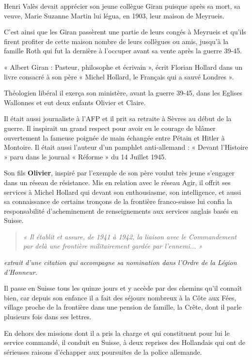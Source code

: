 Henri Valès devait apprécier son jeune collègue Giran puisque après sa mort, sa veuve, Marie
Suzanne Martin lui légua, en 1903, leur maison de Meyrueis.

C’est ainsi que les Giran passèrent une partie de leurs congés à Meyrueis et qu’ils firent
profiter de cette maison nombre de leurs collègues ou amis, jusqu’à la famille Roth qui fut la
dernière à l’occuper avant sa vente après la guerre 39-45.

\vspace{1em}

« Albert Giran : Pasteur, philosophe et écrivain », écrit Florian Hollard dans un livre consacré
à son père « Michel Hollard, le Français qui a sauvé Londres ».

Théologien libéral il exerça son ministère, avant la guerre 39-45, dans les Eglises Wallonnes
et eut deux enfants Olivier et Claire.

Il était aussi journaliste à l’AFP et il prit sa retraite à Sèvres au début de la guerre. Il inspirait
un grand respect pour avoir eu le courage de blâmer ouvertement la fameuse poignée de main
échangée entre Pétain et Hitler à Montoire. Il était aussi l’auteur d’un pamphlet anti-allemand :
« Devant l’Histoire » paru dans le journal « Réforme » du 14 Juillet 1945.

Son fils \textbf{Olivier}, inspiré par l’exemple de son père voulut très jeune s’engager dans un réseau
de résistance. Mis en relation avec le réseau Agir, il offrit ses services à Michel Hollard qui
devant son enthousiasme, son intelligence, et aussi sa connaissance de certains tronçons de la
frontière franco-suisse lui confia la responsabilité d’acheminement de renseignements aux
services anglais basés en Suisse.

\begin{quote}\itshape
« Il établit et assure, de 1941 à 1942, la liaison avec le Commandement par delà une frontière militairement
gardée par l’ennemi... »
\end{quote}

\noindent\textit{extrait d’une citation qui accompagne sa nomination dans l’Ordre de la Légion d’Honneur.}

Il passe en Suisse tous les quinze jours et y accède par des chemins qu’il connaît bien, car
depuis son enfance il a fait des séjours nombreux à la Côte aux Fées, village proche de la
frontière dans une pension de famille, la Crête, dont il parle plusieurs fois dans ses lettres.

En dehors des missions dont il a pris la charge et qui constituent pour lui le service commandé,
il conduit en Suisse, à deux reprises des Hollandais qui ont de sérieuses raisons d’échapper
aux poursuites de la police allemande.


